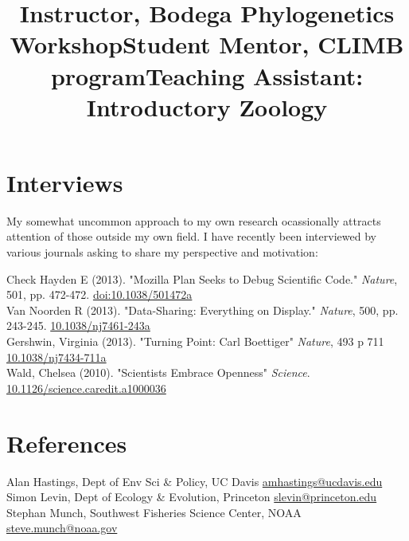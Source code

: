\documentclass[margin]{res}
\begin{document}
\begin{resume}
\title{Instructor, Bodega Phylogenetics Workshop}
\begin{position}
  \vspace{-.5cm}
\end{position}


\title{Student Mentor, CLIMB program}
\begin{position}
  \vspace{-.5cm}
\end{position}

\title{Teaching Assistant: Introductory Zoology}
\begin{position}
  \vspace{-.5cm}
\end{position}




\section{Interviews}

My somewhat uncommon approach to my own research ocassionally attracts attention of those outside my own field.  I have recently been interviewed by various journals asking to share my perspective and motivation:  


Check Hayden E (2013). "Mozilla Plan Seeks to Debug Scientific Code." \emph{Nature}, 501, pp. 472-472. \href{http://doi.org/10.1038/501472a}{doi:10.1038/501472a} \\
Van Noorden R (2013). "Data-Sharing: Everything on Display." \emph{Nature}, 500, pp. 243-245. \href{http://doi.org/10.1038/nj7461-243a}{10.1038/nj7461-243a} \\
Gershwin, Virginia (2013). "Turning Point: Carl Boettiger" \emph{Nature}, 493 p 711 \href{http://doi.org/10.1038/nj7434-711a}{10.1038/nj7434-711a} \\ 
Wald, Chelsea (2010). "Scientists Embrace Openness" \emph{Science}. \href{http://doi.org/10.1126/science.caredit.a1000036}{10.1126/science.caredit.a1000036} 



\section{References}

Alan Hastings, Dept of Env Sci \& Policy, UC Davis \href{mailto:amhastings@ucdavis.edu}{amhastings@ucdavis.edu} \\ 
Simon Levin, Dept of Ecology \& Evolution, Princeton \href{mailto:slevin@princeton.edu}{slevin@princeton.edu} \\
Stephan Munch, Southwest Fisheries Science Center, NOAA \href{mailto:steve.munch@noaa.gov}{steve.munch@noaa.gov} \\


\end{resume}
\end{document}
